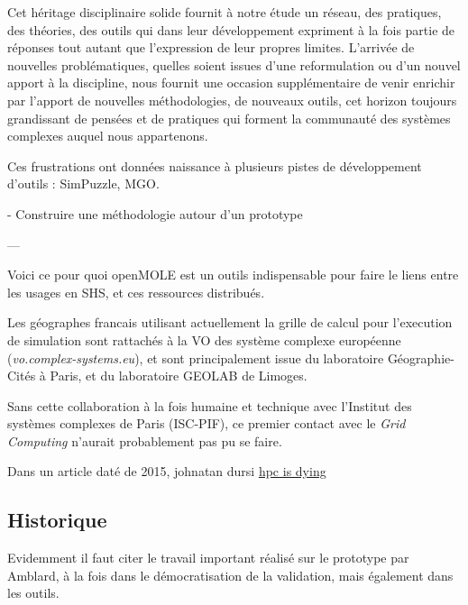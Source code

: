 Cet héritage disciplinaire solide fournit à notre étude un réseau, des pratiques, des théories, des outils  qui dans leur développement expriment à la fois partie de réponses tout autant que l'expression de leur propres limites. L'arrivée de nouvelles problématiques, quelles soient issues d'une reformulation ou d'un nouvel apport à la discipline, nous fournit une occasion supplémentaire de venir enrichir par l'apport de nouvelles méthodologies, de nouveaux outils, cet horizon toujours grandissant de pensées et de pratiques qui forment la communauté des systèmes complexes auquel nous appartenons.









Ces frustrations ont données naissance à plusieurs pistes de développement d'outils : SimPuzzle, MGO.


- Construire une méthodologie autour d'un prototype



---





Voici ce pour quoi openMOLE est un outils indispensable pour faire le liens entre les usages en SHS, et ces ressources distribués.

Les géographes francais utilisant actuellement la grille de calcul pour l'execution de simulation sont rattachés à la VO des système complexe européenne (\textit{vo.complex-systems.eu}), et sont principalement issue du laboratoire Géographie-Cités à Paris, et du laboratoire GEOLAB de Limoges.

Sans cette collaboration à la fois humaine et technique avec l'Institut des systèmes complexes de Paris (ISC-PIF), ce premier contact avec le \textit{Grid Computing} n'aurait probablement pas pu se faire.


Dans un article daté de 2015, johnatan dursi
\href{http://www.dursi.ca/hpc-is-dying-and-mpi-is-killing-it/}{hpc is dying}

\subsection{Historique}

Evidemment il faut citer le travail important réalisé sur le prototype par Amblard, à la fois dans le démocratisation de la validation, mais également dans les outils.

